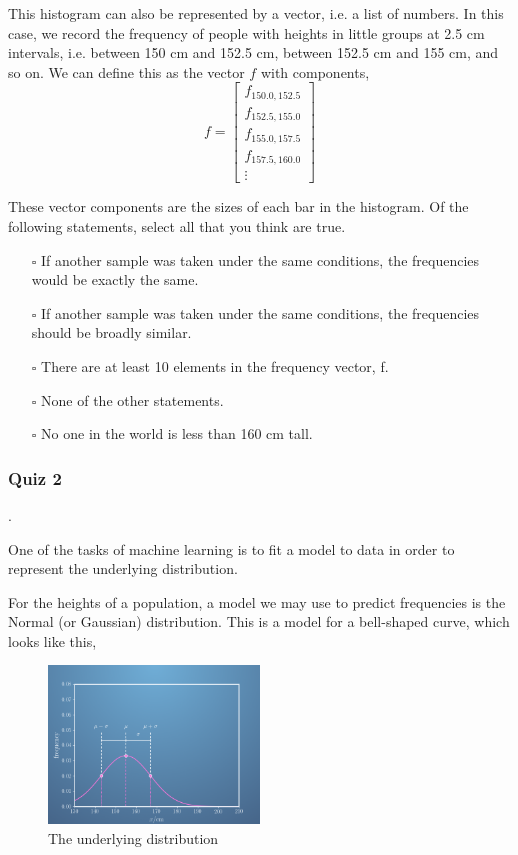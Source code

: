 \documentclass[]{article}
\begin{document}
This histogram can also be represented by a vector, i.e. a list of numbers. In this case, we record the frequency of people with heights in little groups at 2.5 cm intervals, i.e. between 150 cm and 152.5 cm, between 152.5 cm and 155 cm, and so on. We can define this as the vector $ f $ with components,
\begin{equation} \label{f_vector}
	f =
	\begin{bmatrix}
		f_{150.0, 152.5} \\
		f_{152.5, 155.0} \\
		f_{155.0, 157.5} \\
		f_{157.5, 160.0} \\
		\vdots
	\end{bmatrix}
\end{equation}

These vector components are the sizes of each bar in the histogram. Of the following statements, select all that you think are true.

\begin{itemize}
	\item[$\square$] If another sample was taken under the same conditions, the frequencies would be exactly the same.
	\item[$\square$] If another sample was taken under the same conditions, the frequencies should be broadly similar.
	\item[$\square$] There are at least 10 elements in the frequency vector, f.
	\item[$\square$] None of the other statements.
	\item[$\square$] No one in the world is less than 160 cm tall. 
\end{itemize}

\subsubsection{Quiz 2}.

One of the tasks of machine learning is to fit a model to data in order to represent the underlying distribution.

For the heights of a population, a model we may use to predict frequencies is the Normal (or Gaussian) distribution. This is a model for a bell-shaped curve, which looks like this,

\begin{figure}[h]
	\centering
	\includegraphics[width=0.5\textwidth]{underlying_dist}
	\caption{The underlying distribution}
	\label{fig:underlying_dist}
\end{figure}
\end{document}
